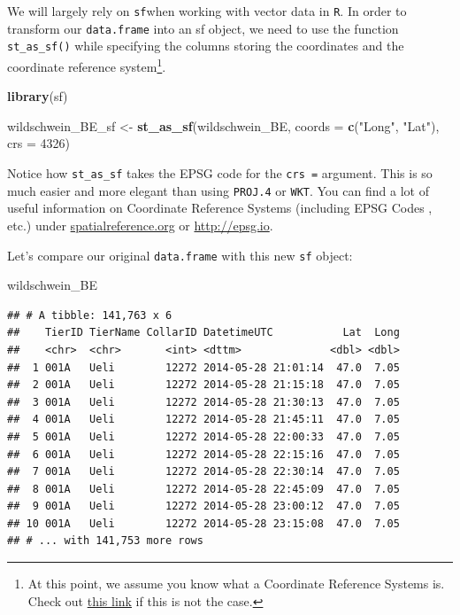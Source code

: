 \documentclass[]{book}
\newenvironment{Shaded}{\begin{snugshade}}{\end{snugshade}}
\newcommand{\KeywordTok}[1]{\textcolor[rgb]{0.13,0.29,0.53}{\textbf{{#1}}}}
\newcommand{\DataTypeTok}[1]{\textcolor[rgb]{0.13,0.29,0.53}{{#1}}}
\newcommand{\DecValTok}[1]{\textcolor[rgb]{0.00,0.00,0.81}{{#1}}}
\newcommand{\StringTok}[1]{\textcolor[rgb]{0.31,0.60,0.02}{{#1}}}
\newcommand{\NormalTok}[1]{{#1}}
\let\rmarkdownfootnote\footnote%
\def\footnote{\protect\rmarkdownfootnote}
\theoremstyle{definition}
\theoremstyle{definition}
\theoremstyle{definition}
\theoremstyle{remark}
\begin{document}
We will largely rely on \texttt{sf}when working with vector data in
\texttt{R}. In order to transform our \texttt{data.frame} into an sf
object, we need to use the function \texttt{st\_as\_sf()} while
specifying the columns storing the coordinates and the coordinate
reference system\footnote{At this point, we assume you know what a
  Coordinate Reference Systems is. Check out
  \href{https://earthdatascience.org/courses/earth-analytics/spatial-data-r/intro-to-coordinate-reference-systems/}{this
  link} if this is not the case.}.

\begin{Shaded}
\begin{Highlighting}[]

\KeywordTok{library}\NormalTok{(sf)}

\NormalTok{wildschwein_BE_sf <-}\StringTok{ }\KeywordTok{st_as_sf}\NormalTok{(wildschwein_BE, }\DataTypeTok{coords =} \KeywordTok{c}\NormalTok{(}\StringTok{"Long"}\NormalTok{, }\StringTok{"Lat"}\NormalTok{), }\DataTypeTok{crs =} \DecValTok{4326}\NormalTok{)}
\end{Highlighting}
\end{Shaded}

Notice how \texttt{st\_as\_sf} takes the EPSG code for the
\texttt{crs\ =} argument. This is so much easier and more elegant than
using \texttt{PROJ.4} or \texttt{WKT}. You can find a lot of useful
information on Coordinate Reference Systems (including EPSG Codes ,
etc.) under
\href{http://spatialreference.org/ref/epsg/2056/}{spatialreference.org}
or \url{http://epsg.io}.

Let's compare our original \texttt{data.frame} with this new \texttt{sf}
object:

\begin{Shaded}
\begin{Highlighting}[]
\NormalTok{wildschwein_BE}
\end{Highlighting}
\end{Shaded}

\begin{verbatim}
## # A tibble: 141,763 x 6
##    TierID TierName CollarID DatetimeUTC           Lat  Long
##    <chr>  <chr>       <int> <dttm>              <dbl> <dbl>
##  1 001A   Ueli        12272 2014-05-28 21:01:14  47.0  7.05
##  2 001A   Ueli        12272 2014-05-28 21:15:18  47.0  7.05
##  3 001A   Ueli        12272 2014-05-28 21:30:13  47.0  7.05
##  4 001A   Ueli        12272 2014-05-28 21:45:11  47.0  7.05
##  5 001A   Ueli        12272 2014-05-28 22:00:33  47.0  7.05
##  6 001A   Ueli        12272 2014-05-28 22:15:16  47.0  7.05
##  7 001A   Ueli        12272 2014-05-28 22:30:14  47.0  7.05
##  8 001A   Ueli        12272 2014-05-28 22:45:09  47.0  7.05
##  9 001A   Ueli        12272 2014-05-28 23:00:12  47.0  7.05
## 10 001A   Ueli        12272 2014-05-28 23:15:08  47.0  7.05
## # ... with 141,753 more rows
\end{verbatim}
\end{document}
